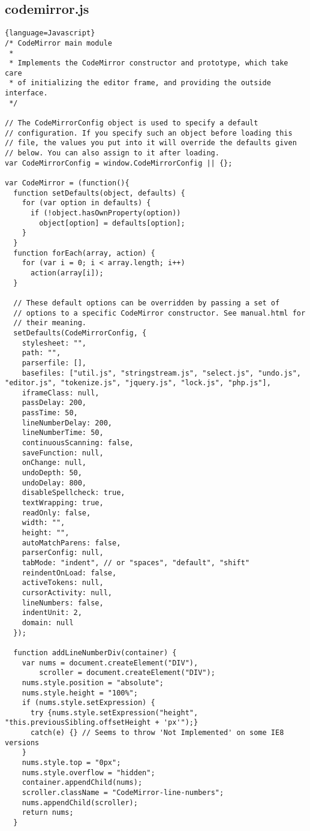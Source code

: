 \subsection{codemirror.js}
\begin{lstlisting}{language=Javascript}
/* CodeMirror main module
 *
 * Implements the CodeMirror constructor and prototype, which take care
 * of initializing the editor frame, and providing the outside interface.
 */

// The CodeMirrorConfig object is used to specify a default
// configuration. If you specify such an object before loading this
// file, the values you put into it will override the defaults given
// below. You can also assign to it after loading.
var CodeMirrorConfig = window.CodeMirrorConfig || {};

var CodeMirror = (function(){
  function setDefaults(object, defaults) {
    for (var option in defaults) {
      if (!object.hasOwnProperty(option))
        object[option] = defaults[option];
    }
  }
  function forEach(array, action) {
    for (var i = 0; i < array.length; i++)
      action(array[i]);
  }

  // These default options can be overridden by passing a set of
  // options to a specific CodeMirror constructor. See manual.html for
  // their meaning.
  setDefaults(CodeMirrorConfig, {
    stylesheet: "",
    path: "",
    parserfile: [],
    basefiles: ["util.js", "stringstream.js", "select.js", "undo.js", "editor.js", "tokenize.js", "jquery.js", "lock.js", "php.js"],
    iframeClass: null,
    passDelay: 200,
    passTime: 50,
    lineNumberDelay: 200,
    lineNumberTime: 50,
    continuousScanning: false,
    saveFunction: null,
    onChange: null,
    undoDepth: 50,
    undoDelay: 800,
    disableSpellcheck: true,
    textWrapping: true,
    readOnly: false,
    width: "",
    height: "",
    autoMatchParens: false,
    parserConfig: null,
    tabMode: "indent", // or "spaces", "default", "shift"
    reindentOnLoad: false,
    activeTokens: null,
    cursorActivity: null,
    lineNumbers: false,
    indentUnit: 2,
    domain: null
  });

  function addLineNumberDiv(container) {
    var nums = document.createElement("DIV"),
        scroller = document.createElement("DIV");
    nums.style.position = "absolute";
    nums.style.height = "100%";
    if (nums.style.setExpression) {
      try {nums.style.setExpression("height", "this.previousSibling.offsetHeight + 'px'");}
      catch(e) {} // Seems to throw 'Not Implemented' on some IE8 versions
    }
    nums.style.top = "0px";
    nums.style.overflow = "hidden";
    container.appendChild(nums);
    scroller.className = "CodeMirror-line-numbers";
    nums.appendChild(scroller);
    return nums;
  }


\end{lstlisting}
